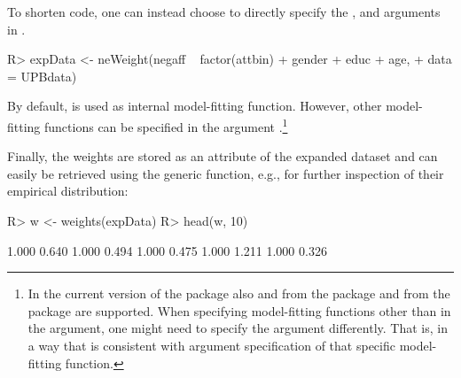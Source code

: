 \documentclass[nojss]{jss}
\begin{document}
\par To shorten code, one can instead choose to directly specify the ,  and  arguments in .
\begin{Schunk}
\begin{Sinput}
R> expData <- neWeight(negaff ~ factor(attbin) + gender + educ + age,
+    data = UPBdata)
\end{Sinput}
\end{Schunk}
\par By default,  is used as internal model-fitting function. However, other model-fitting functions can be specified in the  argument \citep[e.g.,  from the  package;][]{R:VGAM}.\footnote{In the current version of the package also  and  from the  package and  from the  package \citep{R:gam} are supported. When specifying model-fitting functions other than  in the  argument, one might need to specify the  argument differently. That is, in a way that is consistent with argument specification of that specific model-fitting function.}
\par Finally, the weights are stored as an attribute of the expanded dataset and can easily be retrieved using the generic  function, e.g., for further inspection of their empirical distribution:
\begin{Schunk}
\begin{Sinput}
R> w <- weights(expData)
R> head(w, 10)
\end{Sinput}
\begin{Soutput}
 [1] 1.000 0.640 1.000 0.494 1.000 0.475 1.000 1.211 1.000 0.326
\end{Soutput}
\end{Schunk}
\end{document}
